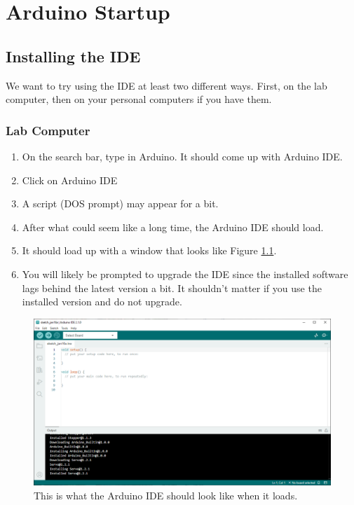 \chapter{Arduino Startup}

\section{Installing the IDE}
We want to try using the IDE at least two different ways. First, on the lab computer, then on your personal
computers if you have them. 

\subsection{Lab Computer}
\begin{enumerate}
    \item On the search bar, type in Arduino. It should come up with Arduino IDE. 
    \item Click on Arduino IDE
    \item A script (DOS prompt) may appear for a bit. 
    \item After what could seem like a long time, the Arduino IDE should load.
    \item It should load up with a window that looks like Figure \ref{fig:emptysketch}.
    \item You will likely be prompted to upgrade the IDE since the installed software lags 
            behind the latest version a bit. It shouldn't matter if you use the installed 
            version and do not upgrade.
\end{enumerate}

\begin{figure}[!htb]
	\centering
	\includegraphics[scale=0.4]{arduinoStart/emptysketch.PNG}
	\caption{This is what the Arduino IDE should look like when it loads.}
	\label{fig:emptysketch}
\end{figure} 

